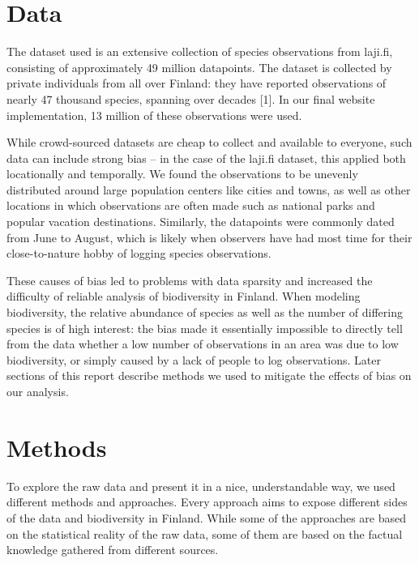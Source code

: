 \documentclass{article}
\begin{document}
\section{Data}
The dataset used is an extensive collection of species observations from laji.fi, consisting of approximately 49 million datapoints. The dataset is collected by private individuals from all over Finland: they have reported observations of nearly 47 thousand species, spanning over decades [1]. In our final website implementation, 13 million of these observations were used.
\par
While crowd-sourced datasets are cheap to collect and available to everyone, such data can include strong bias – in the case of the laji.fi dataset, this applied both locationally and temporally. We found the observations to be unevenly distributed around large population centers like cities and towns, as well as other locations in which observations are often made such as national parks and popular vacation destinations. Similarly, the datapoints were commonly dated from June to August, which is likely when observers have had most time for their close-to-nature hobby of logging species observations.
\par
These causes of bias led to problems with data sparsity and increased the difficulty of reliable analysis of biodiversity in Finland. When modeling biodiversity, the relative abundance of species as well as the number of differing species is of high interest: the bias made it essentially impossible to directly tell from the data whether a low number of observations in an area was due to low biodiversity, or simply caused by a lack of people to log observations. Later sections of this report describe methods we used to mitigate the effects of bias on our analysis.
\section{Methods}
To explore the raw data and present it in a nice, understandable way, we used different methods and approaches. Every approach aims to expose different sides of the data and biodiversity in Finland. While some of the approaches are based on the statistical reality of the raw data, some of them are based on the factual knowledge gathered from different sources.
\end{document}
